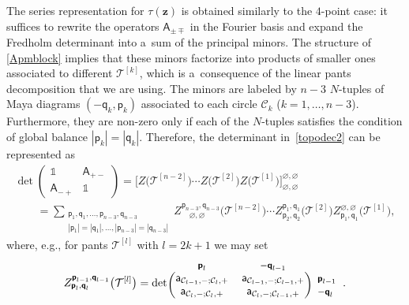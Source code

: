 \documentclass[pdftex]{sigma}
\numberwithin{equation}{section}
\begin{document}
The series representation for $\tau(\boldsymbol z)$ is obtained similarly to the $4$-point case: it suffices to rewrite the operators $\mathsf A_{\pm\mp}$ in the Fourier basis and expand the Fredholm determinant into a~sum of the principal minors. The structure of \eqref{Apmblock} implies that these minors factorize into products of smaller ones associated to different $\mathcal T^{[k]}$, which is a~consequence of the linear pants decomposition that we are using. The minors are labeled by $n-3$ $N$-tuples of Maya diagrams $(-\boldsymbol{\mathsf q}_k,\boldsymbol{\mathsf p}_k)$ associated to each circle $\mathcal C_k$ ($k=1,\ldots,n-3$). Furthermore, they are non-zero only if each of the $N$-tuples satisfies the condition of global balance $|\boldsymbol{\mathsf p}_k|=|\boldsymbol{\mathsf q}_k|$. Therefore, the determinant in~\eqref{topodec2} can be represented as
\begin{gather}
\det \left(\begin{matrix}
\mathds 1 & \mathsf A_{+-}\\
\mathsf A_{-+} & \mathds 1
\end{matrix}\right)=\big[Z\big(\mathcal T^{[n-2]}\big)\cdots Z\big(\mathcal T^{[2]}\big) Z\big(\mathcal T^{[1]}\big)\big]_{\varnothing,\varnothing
}^{\varnothing,\varnothing}\nonumber\\
\qquad{} =\sum_{\substack{\boldsymbol{\mathsf p}_1,\boldsymbol{\mathsf q}_1,\ldots, \boldsymbol{\mathsf p}_{n-3},\boldsymbol{\mathsf q}_{n-3}\\ |\boldsymbol{\mathsf p}_1|=|\boldsymbol{\mathsf q}_1|,\ldots, |\boldsymbol{\mathsf p}_{n-3}|=|\boldsymbol{\mathsf q}_{n-3}|}}
Z_{\quad\varnothing,\varnothing}^{\boldsymbol{\mathsf p}_{n-3},\boldsymbol{\mathsf q}_{n-3}}\big(\mathcal T^{[n-2]}\big)
\cdots
Z^{\boldsymbol{\mathsf p}_{1},\boldsymbol{\mathsf q}_{1}}_{\boldsymbol{\mathsf p}_{2},\boldsymbol{\mathsf q}_{2}}\big(\mathcal T^{[2]}\big)
Z^{\varnothing,\varnothing}_{\boldsymbol{\mathsf p}_{1},\boldsymbol{\mathsf q}_{1}}\big(\mathcal T^{[1]}\big),\label{detAZZZ}
\end{gather}
where, e.g., for pants $\mathcal T^{[l]}$ with $l=2k+1$ we may set
\begin{gather}\label{eld}
Z^{\boldsymbol{\mathsf p}_{l-1},\boldsymbol{\mathsf q}_{l-1}}_{\boldsymbol{\mathsf p}_{l},\boldsymbol{\mathsf q}_{l}}\big(\mathcal T^{[l]}\big) =\det
\begin{blockarray}{ccl}
{\text{\footnotesize$\boldsymbol{\mathsf p}_{l}$}} & {\text{\footnotesize$-\boldsymbol{\mathsf q}_{l-1}$}} \\
\begin{block}{(cc)l}
\mathsf a_{\mathcal C_{l-1},-;\mathcal C_l,+} &
\mathsf a_{\mathcal C_{l-1},-;\mathcal C_{l-1},+} & {\text{\footnotesize$\boldsymbol{\mathsf p}_{l-1}$}} \\
\mathsf a_{\mathcal C_{l},-;\mathcal C_l,+} &
\mathsf a_{\mathcal C_{l},-;\mathcal C_{l-1},+} & {\text{\footnotesize$-\boldsymbol{\mathsf q}_{l}$}} \\
\end{block}
\end{blockarray}.
\end{gather}
\end{document}
